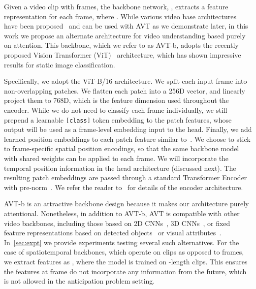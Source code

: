 \documentclass[10pt,twocolumn,letterpaper]{article}
\newcommand{\method}{AVT\xspace}
\newcommand{\txBack}{\method{}-b\xspace}
\begin{document}
Given a video clip with  frames, 
the backbone network, , extracts a feature representation for each frame,  where .
While various video base architectures have been proposed~\cite{carreira2017quo,tran2019video,feichtenhofer2019slowfast,wang2016tsn} and can be used with \method as we demonstrate later, in this work we propose an alternate architecture for video understanding based purely on attention. This backbone, which we refer to as \txBack, adopts the recently proposed Vision Transformer (ViT)~\cite{dosovitskiy2021image} architecture, which has shown impressive results for static image classification. 

Specifically, we adopt the ViT-B/16 architecture. We split each input frame into  non-overlapping patches. We flatten each patch into a 256D vector, and linearly project them to 768D, which is the feature dimension used throughout the encoder. While we do not need to classify each frame individually, we still prepend a learnable {\tt [class]} token embedding to the patch features, 
whose output will be used as a frame-level embedding input to the head. Finally, we add learned position embeddings 
to each patch feature similar to~\cite{dosovitskiy2021image}. We choose to stick to frame-specific spatial position encodings, so that the same backbone model with shared weights can be applied to each frame. We will incorporate the temporal position information in the head architecture (discussed next).
The resulting patch embeddings are passed through a standard Transformer Encoder~\cite{vaswani2017attention} with pre-norm~\cite{wang2019learning}. 
We refer the reader to~\cite{dosovitskiy2021image} for details of the encoder architecture.


\txBack is an attractive backbone design because it makes our architecture purely attentional.  Nonetheless, in addition to \txBack, \method is compatible with other video backbones, including those based on 2D CNNs~\cite{wang2016tsn,Simonyan_14b}, 3D CNNs~\cite{carreira2017quo,tran2019video,feichtenhofer2019slowfast}, or fixed feature representations based on detected objects~\cite{bertasius2020classifying,bertasius2020cobe} or visual attributes~\cite{miech2019leveraging}. In~\cref{sec:expt} we provide experiments testing several such alternatives.  For the case of spatiotemporal backbones, which operate on clips as opposed to frames, we extract features as , where the model is trained on -length clips.  This ensures the features at frame  do not incorporate any information from the future, which is not allowed in the anticipation problem setting.  
\end{document}
